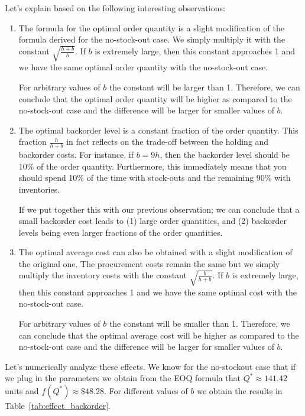 \begin{solution}
Let's explain based on the following interesting observations: 
\begin{enumerate}
\item The formula for the optimal order quantity is a slight modification of the formula derived for the no-stock-out case. We simply multiply it with the constant $\sqrt{\frac{h+b}{b}}$. If $b$ is extremely large, then this constant approaches 1 and we have the same optimal order quantity with the no-stock-out case. 

For arbitrary values of $b$ the constant will be larger than 1. Therefore, we can conclude that the optimal order quantity will be higher as compared to the no-stock-out case and the difference will be larger for smaller values of $b$. 

\item The optimal backorder level is a constant fraction of the order quantity. This fraction $\frac{h}{h+b}$ in fact reflects on the trade-off between the holding and backorder costs. For instance, if $b=9h$, then the backorder level should be 10\% of the order quantity. Furthermore, this immediately means that you should spend 10\% of the time with stock-outs and the remaining 90\% with inventories. 

If we put together this with our previous observation; we can conclude that a small backorder cost leads to (1) large order quantities, and (2) backorder levels being even larger fractions of the order quantities. 

\item The optimal average cost can also be obtained with a slight modification of the original one. The procurement costs remain the same but we simply multiply the inventory costs with the constant $\sqrt{\frac{b}{h+b}}$. If $b$ is extremely large, then this constant approaches 1 and we have the same optimal cost with the no-stock-out case. 

For arbitrary values of $b$ the constant will be smaller than 1. Therefore, we can conclude that the optimal average cost will be higher as compared to the no-stock-out case and the difference will be larger for smaller values of $b$. 
\end{enumerate}

Let's numerically analyze these effects. We know for the no-stockout case that if we plug in the parameters we obtain from the EOQ formula that $Q^{*} \approx 141.42$ units and $f(Q^{*}) \approx \mathdollar 48.28$. For different values of $b$ we obtain the results in Table~\ref{tab:effect_backorder}. 


\end{solution}
